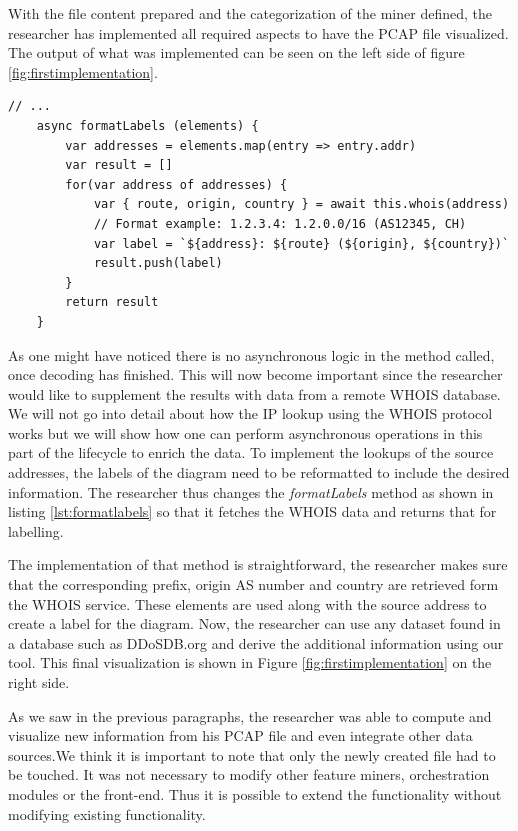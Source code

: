 With the file content prepared and the categorization of the miner defined, the researcher has implemented all required aspects to have the PCAP file visualized. The output of what was implemented can be seen on the left side of figure \ref{fig:firstimplementation}.

\begin{lstlisting}[caption={Initial content of the newly create Miner},label={lst:formatlabels}]
    // ...
    async formatLabels (elements) {
        var addresses = elements.map(entry => entry.addr)
        var result = []
        for(var address of addresses) {
            var { route, origin, country } = await this.whois(address)
            // Format example: 1.2.3.4: 1.2.0.0/16 (AS12345, CH)
            var label = `${address}: ${route} (${origin}, ${country})`
            result.push(label)
        }
        return result
    }
\end{lstlisting}

As one might have noticed there is no asynchronous logic in the method called, once decoding has finished. This will now become important since the researcher would like to supplement the results with data from a remote WHOIS database. We will not go into detail about how the IP lookup using the WHOIS protocol works but we will show how one can perform asynchronous operations in this part of the lifecycle to enrich the data.
To implement the lookups of the source addresses, the labels of the diagram need to be reformatted to include the desired information. The researcher thus changes the \textit{formatLabels} method as shown in listing \ref{lst:formatlabels} so that it fetches the WHOIS data and returns that for labelling.

The implementation of that method is straightforward, the researcher makes sure that the corresponding prefix, origin AS number and country are retrieved form the WHOIS service. These elements are used along with the source address to create a label for the diagram. Now, the researcher can use any dataset found in a database such as DDoSDB.org and derive the additional information using our tool. This final visualization is shown in Figure \ref{fig:firstimplementation} on the right side.

As we saw in the previous paragraphs, the researcher was able to compute and visualize new information from his PCAP file and even integrate other data sources.We think it is important to note that only the newly created file had to be touched. It was not necessary to modify other feature miners, orchestration modules or the front-end. Thus it is possible to extend the functionality without modifying existing functionality.

